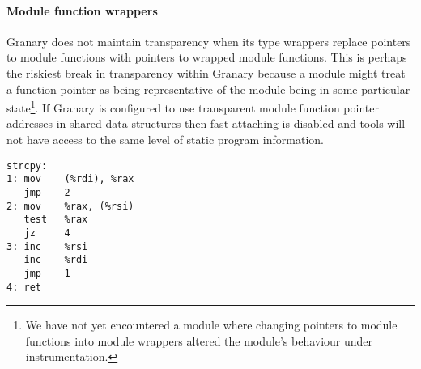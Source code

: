 \documentclass[preprint]{sigplanconf}
\begin{document}

\paragraph{Module function wrappers} Granary does not maintain transparency when its type wrappers replace pointers to module functions with pointers to wrapped module functions. This is perhaps the riskiest break in transparency within Granary because a module might treat a function pointer as being representative of the module being in some particular state\footnote{We have not yet encountered a module where changing pointers to module functions into module wrappers altered the module's behaviour under instrumentation.}. If Granary is configured to use transparent module function pointer addresses in shared data structures then fast attaching is disabled and tools will not have access to the same level of static program information.


\lstset{language=[x64]Assembler}
\newsavebox\asmbox
\begin{lrbox}{\asmbox}
\begin{minipage}[b]{4cm}
\begin{lstlisting}[basicstyle=\footnotesize\ttfamily]
strcpy:
1: mov    (%rdi), %rax
   jmp    2
2: mov    %rax, (%rsi)
   test   %rax
   jz     4
3: inc    %rsi
   inc    %rdi
   jmp    1
4: ret
\end{lstlisting}
\end{minipage}
\end{lrbox}
\end{document}
